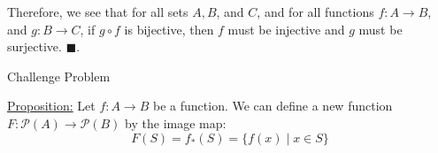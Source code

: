 \documentclass{article}
\theoremstyle{definition}
\renewcommand{\qed}{\blacksquare}
\begin{document}
	Therefore, we see that for all sets $A, B$, and $C$, and for all functions $f : A \rightarrow B$, and $g : B \rightarrow C$, if $g \circ f$ is bijective, then $f$ must be injective and $g$ must be surjective.
	$\qed$.

	\vspace{0.5cm}


	\newpage

	\noindent Challenge Problem
	\vspace{0.2cm}

	\underline{Proposition:}
	Let $f: A \rightarrow B$ be a function.
	We can define a new function $F: \mathcal{P}(A) \rightarrow \mathcal{P}(B)$ by the image map:\[ F(S) = f_{*}(S) = \{ f(x)  \mid x \in S \} \]
\end{document}
